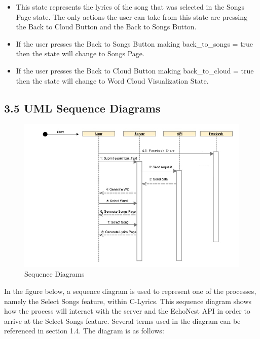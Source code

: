 \documentclass[]{article}
\begin{document}
\begin{itemize}
  \begin{itemize}
  \itemsep1pt\parskip0pt
  \item
    This state represents the lyrics of the song that was selected in
    the Songs Page state. The only actions the user can take from this
    state are pressing the Back to Cloud Button and the Back to Songs
    Button.
  \item
    If the user presses the Back to Songs Button making back\_to\_songs
    = true then the state will change to Songs Page.
  \item
    If the user presses the Back to Cloud Button making back\_to\_cloud
    = true then the state will change to Word Cloud Visualization State.
  \end{itemize}
\end{itemize}

\subsection{3.5 UML Sequence Diagrams}\label{uml-sequence-diagrams}

\begin{figure}[htbp]
\centering
\includegraphics{sequence_diagram_2.jpg}
\caption{Sequence Diagrams}
\end{figure}

In the figure below, a sequence diagram is used to represent one of the
processes, namely the Select Songs feature, within C-Lyrics. This
sequence diagram shows how the process will interact with the server and
the EchoNest API in order to arrive at the Select Songs feature. Several
terms used in the diagram can be referenced in section 1.4. The diagram
is as follows:
\end{document}
